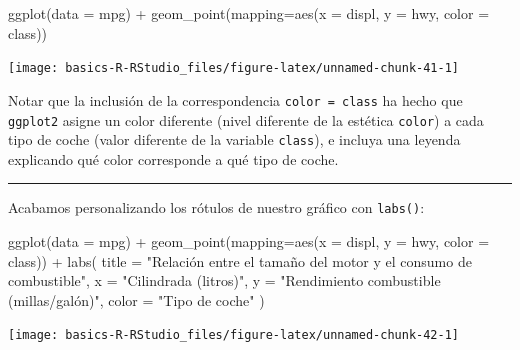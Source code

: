 \documentclass[
  title=normal,
  notoc,
  bib=normal]{mnye}
\newenvironment{Shaded}{\begin{snugshade}}{\end{snugshade}}
\newcommand{\AttributeTok}[1]{\textcolor[rgb]{0.77,0.63,0.00}{#1}}
\newcommand{\FunctionTok}[1]{\textcolor[rgb]{0.00,0.00,0.00}{#1}}
\newcommand{\NormalTok}[1]{#1}
\newcommand{\SpecialCharTok}[1]{\textcolor[rgb]{0.00,0.00,0.00}{#1}}
\newcommand{\StringTok}[1]{\textcolor[rgb]{0.31,0.60,0.02}{#1}}
\begin{document}
\begin{Shaded}
\begin{Highlighting}[]
\FunctionTok{ggplot}\NormalTok{(}\AttributeTok{data =}\NormalTok{ mpg) }\SpecialCharTok{+} 
    \FunctionTok{geom\_point}\NormalTok{(}\AttributeTok{mapping=}\FunctionTok{aes}\NormalTok{(}\AttributeTok{x =}\NormalTok{ displ, }\AttributeTok{y =}\NormalTok{ hwy, }\AttributeTok{color =}\NormalTok{ class))  }
\end{Highlighting}
\end{Shaded}

\begin{center}\texttt{[image: basics-R-RStudio\_files/figure-latex/unnamed-chunk-41-1]} \end{center}

Notar que la inclusión de la correspondencia \texttt{color\ =\ class} ha hecho que \texttt{ggplot2} asigne un color diferente (nivel diferente de la estética \texttt{color}) a cada tipo de coche (valor diferente de la variable \texttt{class}), e incluya una leyenda explicando qué color corresponde a qué tipo de coche.

\begin{center}\rule{0.5\linewidth}{0.5pt}\end{center}

Acabamos personalizando los rótulos de nuestro gráfico con \texttt{labs()}:

\begin{Shaded}
\begin{Highlighting}[]
\FunctionTok{ggplot}\NormalTok{(}\AttributeTok{data =}\NormalTok{ mpg) }\SpecialCharTok{+} 
    \FunctionTok{geom\_point}\NormalTok{(}\AttributeTok{mapping=}\FunctionTok{aes}\NormalTok{(}\AttributeTok{x =}\NormalTok{ displ, }\AttributeTok{y =}\NormalTok{ hwy, }\AttributeTok{color =}\NormalTok{ class)) }\SpecialCharTok{+}
    \FunctionTok{labs}\NormalTok{(}
        \AttributeTok{title =} \StringTok{"Relación entre el tamaño del motor y el consumo de combustible"}\NormalTok{, }
        \AttributeTok{x =} \StringTok{"Cilindrada (litros)"}\NormalTok{,}
        \AttributeTok{y =} \StringTok{"Rendimiento combustible (millas/galón)"}\NormalTok{,}
        \AttributeTok{color =} \StringTok{"Tipo de coche"}
\NormalTok{     )}
\end{Highlighting}
\end{Shaded}

\begin{center}\texttt{[image: basics-R-RStudio\_files/figure-latex/unnamed-chunk-42-1]} \end{center}
\end{document}
